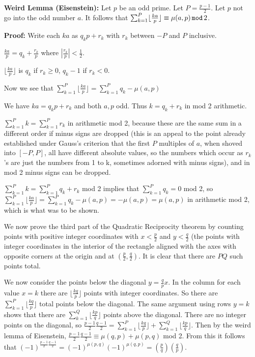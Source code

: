 \documentclass[12pt]{article}
\begin{document}
{\bf Weird Lemma (Eisenstein):}  Let $p$ be an odd prime.   Let $P = \frac{p-1}2$.  Let $p$ not go into the odd number $a$.   It follows that $\sum_{k=1}^P\lfloor \frac{ka}p\rfloor \equiv  \mu(a,p)\, {\tt mod} \,2$.

{\bf Proof:}  Write each $ka$ as $q_kp+r_k$ with $r_k$ between $-P$ and $P$ inclusive.

$\frac{ka}p = q_k + \frac{r_k}p$ where $|\frac{r_k}p|<\frac 12$.

$\lfloor \frac{ka}p\rfloor$ is $q_k$ if $r_k\geq 0$, $q_k-1$ if $r_k<0$.


Now we see that  $\sum_{k=1}^P\lfloor \frac{ka}p\rfloor = \sum_{k=1}^P q_k - \mu(a,p)$

We have $ka=q_kp+r_k$ and both $a,p$ odd.   Thus $k=q_k+r_k$ in mod 2 arithmetic.

$\sum_{k=1}^P k=\sum_{k=1}^P r_k$ in arithmetic mod 2, because these are the same sum in a different order if minus signs are dropped (this is an appeal to the point already established under Gauss's criterion that the first $P$ multiples of $a$, when shoved into $[-P,P]$, all have different absolute values, so the numbers which occur as $r_k$'s are just the numbers from 1 to k, sometimes adorned with minus signs), and in mod 2 minus signs can be dropped.

$\sum_{k=1}^P k = \sum_{k=1}^P q_k+r_k$ mod 2 implies that $\sum_{k=1}^P q_k = 0$ mod 2, so $\sum_{k=1}^P\lfloor \frac{ka}p\rfloor = \sum_{k=1}^P q_k - \mu(a,p) = -\mu(a,p)=\mu(a,p)$ in arithmetic mod 2, which is what was to be shown.


We now prove the third part of the Quadratic Reciprocity theorem by counting points with positive integer coordinates with $x<\frac p2$ and $y <\frac q2$ (the points with integer coordinates in the interior of the rectangle aligned with the axes
with opposite corners at the origin and at $(\frac p2, \frac q2)$.  It is clear that there are $PQ$ such points total.

We now consider the points below the diagonal $y = \frac qp x$.   In the column for each value $x=k$ there are $\lfloor \frac{kq}p \rfloor$ points with integer coordinates.   So there are $\sum_{k=1}^P\lfloor \frac{kq}p\rfloor$ total points below
the diagonal.   The same argument using rows $y=k$ shows that there are $\sum_{k=1}^Q\lfloor \frac{kp}q\rfloor$ points above the diagonal.  There are no integer points on the diagonal, so 
$\frac{p-1}2\frac{q-1}2 = \sum_{k=1}^P\lfloor \frac{kq}p\rfloor + \sum_{k=1}^Q\lfloor \frac{kp}q\rfloor$.  Then by the weird lemma of Eisenstein, $\frac{p-1}2\frac{q-1}2 \equiv \mu(q,p) + \mu(p,q)$ mod 2.  From this it follows that
$(-1)^{\frac{p-1}2\frac{q-1}2} = (-1)^{\mu(p,q)}(-1)^{\mu(q,p)} = \left(\frac pq\right)\left(\frac qp\right)$.
\end{document}
